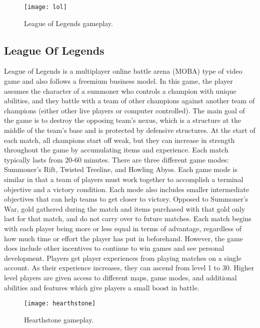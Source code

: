 \begin{figure}[h]
\centering
\texttt{[image: lol]}
\caption{League of Legends gameplay.}
\end{figure}

\subsection{League Of Legends}
League of Legends is a multiplayer online battle arena (MOBA) type of video game and also follows a freemium business model. In this game, the player assumes the character of a summoner who controls a champion with unique abilities, and they battle with a team of other champions against another team of champions (either other live players or computer controlled). The main goal of the game is to destroy the opposing team's nexus, which is a structure at the middle of the team's base and is protected by defensive structures. At the start of each match, all champions start off weak, but they can increase in strength throughout the game by accumulating items and experience. Each match typically lasts from 20-60 minutes. There are three different game modes: Summoner's Rift, Twisted Treeline, and Howling Abyss. Each game mode is similar in that a team of players must work together to accomplish a terminal objective and a victory condition. Each mode also includes smaller intermediate objectives that can help teams to get closer to victory. 
	Opposed to Summoner's War, gold gathered during the match and items purchased with that gold only last for that match, and do not carry over to future matches. Each match begins with each player being more or less equal in terms of advantage, regardless of how much time or effort the player has put in beforehand. 
	However, the game does include other incentives to continue to win games and see personal development. Players get player experiences from playing matches on a single account. As their experience increases, they can ascend from level 1 to 30. Higher level players are given access to different maps, game modes, and additional abilities and features which give players a small boost in battle. 
	
\begin{figure}[h]
\centering
\texttt{[image: hearthstone]}
\caption{Hearthstone gameplay.}
\end{figure}	
